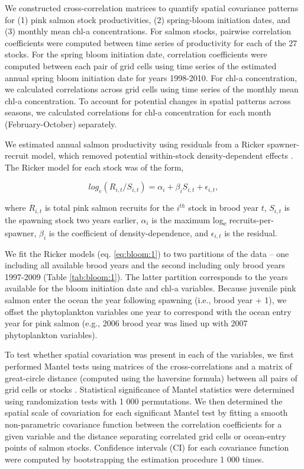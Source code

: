 We constructed cross-correlation matrices to quantify spatial covariance
patterns for (1) pink salmon stock productivities, (2) spring-bloom initiation
dates, and (3) monthly mean chl-a concentrations. For salmon stocks, pairwise
correlation coefficients were computed between time series of productivity for
each of the 27 stocks. For the spring bloom initiation date, correlation
coefficients were computed between each pair of grid cells using time series of
the estimated annual spring bloom initiation date for years 1998-2010. For chl-a
concentration, we calculated correlations across grid cells using time series of
the monthly mean chl-a concentration. To account for potential changes in
spatial patterns across seasons, we calculated correlations for chl-a
concentration for each month (February-October) separately.

We estimated annual salmon productivity using residuals from a Ricker
spawner-recruit model, which removed potential within-stock density-dependent
effects \citep{Pyper2001a, Mueter2002a, Ricker1954a}.  The Ricker model for each
stock was of the form,

\begin{equation}
log_e(R_{i,t} / S_{i,t}) = \alpha_i + \beta_i S_{i,t} + \epsilon_{i,t},
\label{eq:bloom:1}
\end{equation}

\noindent where \(R_{i,t}\) is total pink salmon recruits for the \(i^{th}\)
stock in brood year \(t\), \(S_{i,t}\) is the spawning stock two years earlier,
\(\alpha_i\) is the maximum log\textsubscript{e} recruits-per-spawner,
\(\beta_i\) is the coefficient of density-dependence, and \(\epsilon_{i,t}\) is
the residual.

We fit the Ricker models (eq. \ref{eq:bloom:1}) to two partitions of the data --
one including all available brood years and the second including only brood
years 1997-2009 (Table \ref{tab:bloom:1}). The latter partition corresponds to
the years available for the bloom initiation date and chl-a variables. Because
juvenile pink salmon enter the ocean the year following spawning (i.e., brood
year + 1), we offset the phytoplankton variables one year to correspond with the
ocean entry year for pink salmon (e.g., 2006 brood year was lined up with 2007
phytoplankton variables).

To test whether spatial covariation was present in each of the variables, we
first performed Mantel tests using matrices of the cross-correlations and a
matrix of great-circle distance (computed using the haversine formula) between
all pairs of grid cells or stocks \citep{Legendre1998a, Koenig1999a}.
Statistical significance of Mantel statistics were determined using
randomization tests with 1 000 permutations. We then determined the spatial
scale of covariation for each significant Mantel test by fitting a smooth
non-parametric covariance function \citep{Bjornstad2001a} between the
correlation coefficients for a given variable and the distance separating
correlated grid cells or ocean-entry points of salmon stocks. Confidence
intervals (CI) for each covariance function were computed by bootstrapping the
estimation procedure 1 000 times.

